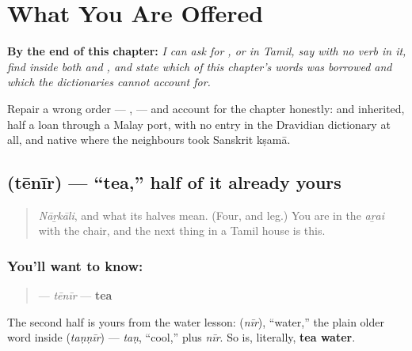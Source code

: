 
\chapter{What You Are Offered}
\label{ch:ta-what-you-are-offered}

\begin{chapteropening}
\textbf{By the end of this chapter:} \emph{I can ask for ,  or  in Tamil, say   with no verb in it, find  inside both  and , and state which of this chapter's words was borrowed and which the dictionaries cannot account for.}

Repair a wrong order — ,   — and account for the chapter honestly:  and  inherited,  half a loan through a Malay port,  with no entry in the Dravidian dictionary at all, and  native where the neighbours took Sanskrit kṣamā.
\end{chapteropening}

\section[\texorpdfstring{\ta{தேநீர்} (tēnīr)}{தேநீர் (tēnīr)}]{ (tēnīr) — \textquotedblleft{}tea,\textquotedblright{} half of it already yours}

\label{lesson:TA-C36-teneer}



\begin{quote}
\emph{Nāṟkāli}, and what its halves mean. (Four, and leg.) You are in the \emph{aṟai} with the chair, and the next thing in a Tamil house is this.
\end{quote}

\subsection*{You'll want to know: }
\begin{quote}
\textbf{} — \emph{tēnīr} — \textbf{tea}
\end{quote}

The second half is yours from the water lesson: \textbf{} (\emph{nīr}), \textquotedblleft{}water,\textquotedblright{} the plain older word inside \textbf{} (\emph{taṇṇīr}) — \emph{taṇ}, \textquotedblleft{}cool,\textquotedblright{} plus \emph{nīr}. So \textbf{} is, literally, \textbf{tea water}.

